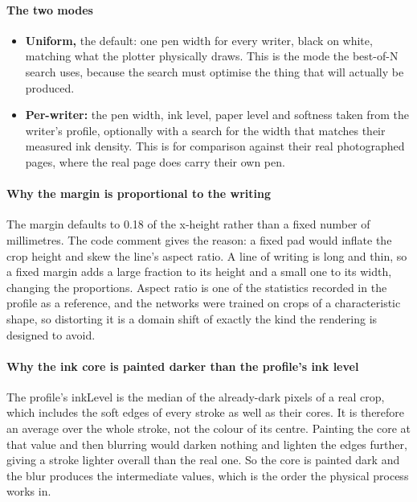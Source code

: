\paragraph{The two modes}

\begin{itemize}\setlength\itemsep{0pt}
  \item \textbf{Uniform,} the default: one pen width for every writer, black on white, matching what the plotter physically draws. This is the mode the best-of-N search uses, because the search must optimise the thing that will actually be produced.
  \item \textbf{Per-writer:} the pen width, ink level, paper level and softness taken from the writer's profile, optionally with a search for the width that matches their measured ink density. This is for comparison against their real photographed pages, where the real page does carry their own pen.
\end{itemize}

\paragraph{Why the margin is proportional to the writing}
The margin defaults to 0.18 of the x-height rather than a fixed number of millimetres. The code comment gives the reason: a fixed pad would inflate the crop height and skew the line's aspect ratio. A line of writing is long and thin, so a fixed margin adds a large fraction to its height and a small one to its width, changing the proportions. Aspect ratio is one of the statistics recorded in the profile as a reference, and the networks were trained on crops of a characteristic shape, so distorting it is a domain shift of exactly the kind the rendering is designed to avoid.


\paragraph{Why the ink core is painted darker than the profile's ink level}
The profile's inkLevel is the median of the already-dark pixels of a real crop, which includes the soft edges of every stroke as well as their cores. It is therefore an average over the whole stroke, not the colour of its centre. Painting the core at that value and then blurring would darken nothing and lighten the edges further, giving a stroke lighter overall than the real one. So the core is painted dark and the blur produces the intermediate values, which is the order the physical process works in.


